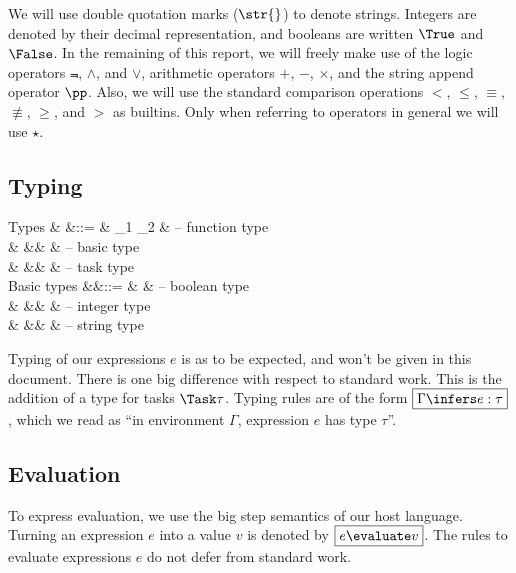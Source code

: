 We will use double quotation marks ($\str{}$) to denote strings.
Integers are denoted by their decimal representation,
and booleans are written $\True$ and $\False$.
In the remaining of this report,
we will freely make use of the logic operators $\Not$, $\land$, and $\lor$,
arithmetic operators $+$, $-$, $\times$,
and the string append operator $\pp$.
Also, we will use the standard comparison operations $<$, $\le$, $\equiv$, $\nequiv$, $\ge$, and $>$
as builtins.
Only when referring to operators in general we will use $\star$.


\subsection{Typing}

\begin{grammar}
  Types
    & \tau &::= & \tau_1 \to \tau_2 & – function type \\
    &      &\mid& \beta             & – basic type \\
    &      &\mid& \Task \tau        & – task type \\
  Basic types
    &\beta &::= & \Bool             & – boolean type \\
    &      &\mid& \Int              & – integer type \\
    &      &\mid& \String           & – string type \\
\end{grammar}
Typing of our expressions $e$ is as to be expected,
and won't be given in this document.
There is one big difference with respect to standard work.
This is the addition of a type for tasks $\Task \tau$.
Typing rules are of the form $\boxed{\Gamma \infers e : \tau}$,
which we read as \enquote{in environment $\Gamma$, expression $e$ has type $\tau$}.


\subsection{Evaluation}
\label{sec:evaluation}

To express evaluation,
we use the big step semantics of our host language.
Turning an expression $e$ into a value $v$ is denoted by $\boxed{e \evaluate v}$.
The rules to evaluate expressions $e$ do not defer from standard work.

